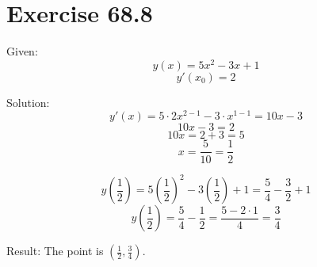 \documentclass[a4paper, 10pt]{scrartcl}
\begin{document}
\section{Exercise 68.8}

Given:
\[y(x) = 5x^{2} - 3x + 1\]
\[y'(x_{0}) = 2\]

Solution:
\[y'(x) = 5\cdot2 x^{2 - 1} - 3\cdot x^{1 - 1} = 10x - 3\]
\[10x - 3 = 2\]
\[10x = 2 + 3 = 5\]
\[x = \frac{5}{10} = \frac{1}{2}\]

\[y(\frac{1}{2}) = 5(\frac{1}{2})^{2} - 3(\frac{1}{2}) + 1 =
                   \frac{5}{4} - \frac{3}{2} + 1\]
\[y(\frac{1}{2}) = \frac{5}{4} - \frac{1}{2} = \frac{5 - 2\cdot1}{4} = \frac{3}{4}\]

Result:
The point is $(\frac{1}{2}, \frac{3}{4})$.
\end{document}
